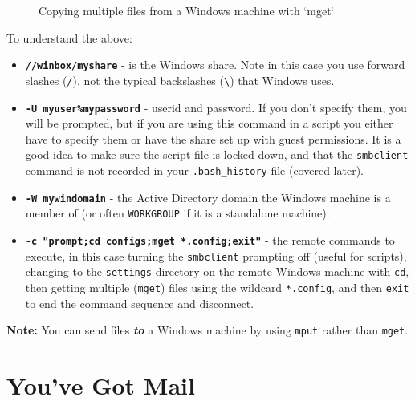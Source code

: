 \documentclass[10pt,american,]{book}
\newenvironment{Shaded}{\begin{snugshade}}{\end{snugshade}}
\newcommand{\KeywordTok}[1]{\textcolor[rgb]{0.13,0.29,0.53}{\textbf{{#1}}}}
\newcommand{\StringTok}[1]{\textcolor[rgb]{0.31,0.60,0.02}{{#1}}}
\newcommand{\NormalTok}[1]{{#1}}
\numberwithin{figure}{chapter}
\DeclareRobustCommand{\drcap}[1]{\begin{figure}[H]\caption{#1}\end{figure}}
\renewcommand{\KeywordTok}[1]{{#1}}
\renewcommand{\StringTok}[1]{{#1}}
\renewcommand{\NormalTok}[1]{{#1}}
\begin{document}
\drcap{Copying multiple files from a Windows machine with `mget`}

\begin{Shaded}
\end{Shaded}

To understand the above:

\begin{itemize}
\item
  \textbf{\texttt{//winbox/myshare}} - is the Windows share. Note in
  this case you use forward slashes (\texttt{/}), not the typical
  backslashes (\texttt{\textbackslash{}}) that Windows uses.
\item
  \textbf{\texttt{-U\ myuser\%mypassword}} - userid and password. If you
  don't specify them, you will be prompted, but if you are using this
  command in a script you either have to specify them or have the share
  set up with guest permissions. It is a good idea to make sure the
  script file is locked down, and that the \texttt{smbclient} command is
  not recorded in your \texttt{.bash\_history} file (covered later).
\item
  \textbf{\texttt{-W\ mywindomain}} - the Active Directory domain the
  Windows machine is a member of (or often \texttt{WORKGROUP} if it is a
  standalone machine).
\item
  \textbf{\texttt{-c\ "prompt;cd\ configs;mget\ *.config;exit"}} - the
  remote commands to execute, in this case turning the
  \texttt{smbclient} prompting off (useful for scripts), changing to the
  \texttt{settings} directory on the remote Windows machine with
  \texttt{cd}, then getting multiple (\texttt{mget}) files using the
  wildcard \texttt{*.config}, and then \texttt{exit} to end the command
  sequence and disconnect.
\end{itemize}

\textbf{Note:} You can send files \textbf{\emph{to}} a Windows machine
by using \texttt{mput} rather than \texttt{mget}.

\section*{You've Got Mail}\label{youve-got-mail}
\end{document}
